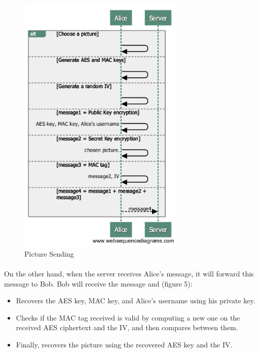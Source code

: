 	    \begin{figure}[H]
	    
	      \centering
	      \includegraphics[width=8cm]{images/architecture/picture_sending}
	      \caption{Picture Sending}
	     
	    \end{figure}
	    
	    \paragraph{}
	      On the other hand, when the server receives Alice's message, it will forward this message to Bob. Bob will receive the message and (figure 5):
	      \begin{itemize}
	       \item Recovers the AES key, MAC key, and Alice's username using his private key.
	       \item Checks if the MAC tag received is valid by computing a new one on the received AES ciphertext and the IV, and then compares between them.
	       \item Finally, recovers the picture using the recovered AES key and the IV.
	      \end{itemize}

	    
	    
